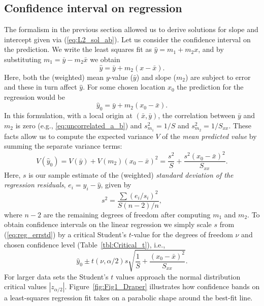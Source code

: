 \subsection{Confidence interval on regression}
The formalism in the previous section allowed us to derive
solutions for slope and intercept given via (\ref{eq:L2_sol_ab}). Let us consider the confidence interval on the prediction.  We write the least squares
fit as $\hat{y} = m_1 + m_2 x$, and by substituting $m_1 = \bar{y} - m_2 \bar{x}$ we obtain
\begin{equation}
	\hat{y} = \bar{y} + m_2(x-\bar{x}).
\end{equation}
Here, both the (weighted) mean $y$-value ($\bar{y}$) and slope ($m_2$) are subject to error and these in turn affect $\hat{y}$.  For some
chosen location $x_0$ the prediction for the regression would be
\begin{equation}
	\hat{y}_0 = \bar{y} + m_2(x_0-\bar{x}).
\end{equation}
In this formulation, with a local origin at $(\bar{x}, \bar{y})$, the correlation between $\bar{y}$ and $m_2$ is zero (e.g., \ref{eq:uncorrelated_a_b})
and $s^2_{m_1} = 1/S$ and $s^2_{m_2} = 1/S_{xx}$.
These facts allow us to compute the expected variance $V$ of the \emph{mean predicted value} by summing the separate variance terms:
\begin{equation}
	V(\hat{y}_0) = V(\bar{y}) + V(m_2)(x_0-\bar{x})^2 = \frac{s^2}{S} + \frac{s^2(x_0 - \bar{x})^2}{S_{xx}}.
\end{equation}
Here, $s$ is our sample estimate of the (weighted) \emph{standard deviation of the regression residuals}, $e_i = y_i - \hat{y}$, given by
\begin{equation}
	s^2 = \frac{\sum (e_i/s_i)^2}{S(n-2)/n},
	\label{eq:reg_errstd}
\end{equation}
where $n-2$ are the remaining degrees of freedom after computing $m_1$ and $m_2$.
To obtain confidence intervals on the linear regression we simply scale $s$ from (\ref{eq:reg_errstd}) by a critical
Student's $t$-value for the degrees of freedom $\nu$ and chosen confidence level (Table~\ref{tbl:Critical_t}), i.e.,
\begin{equation}
	\hat{y}_0 \pm t(\nu,\alpha/2) s \sqrt{\frac{1}{S} +  \frac{(x_0 - \bar{x})^2}{S_{xx}}}.
\end{equation}
For larger data sets the Student's $t$ values approach the normal distribution critical values $|z_{\alpha/2}|$.
Figure~\ref{fig:Fig1_Draper} illustrates how confidence bands on a least-squares regression fit takes
on a parabolic shape around the best-fit line.

